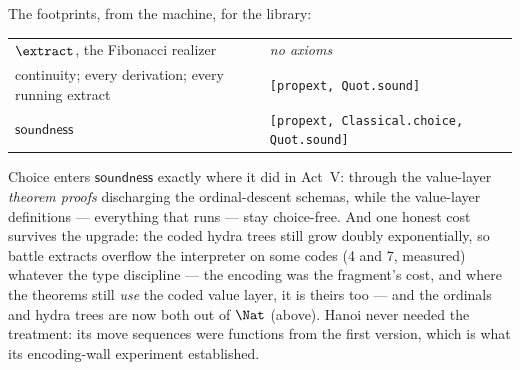 The footprints, from the machine, for the \haomega{} library:
\begin{center}\small
\begin{tabular}{ll}
\toprule
$\extract$, the Fibonacci realizer & \emph{no axioms}\\
continuity; every derivation; every running extract & \texttt{[propext, Quot.sound]}\\
$\mathsf{soundness}$ & \texttt{[propext, Classical.choice, Quot.sound]}\\
\bottomrule
\end{tabular}
\end{center}
Choice enters $\mathsf{soundness}$ exactly where it did in Act~V: through
the value-layer \emph{theorem proofs} discharging the ordinal-descent
schemas, while the value-layer definitions --- everything that runs ---
stay choice-free. And one honest cost survives the upgrade: the coded
hydra trees still grow doubly exponentially, so battle extracts overflow
the interpreter on some codes (4 and 7, measured) whatever the type
discipline --- the encoding was the fragment's cost, and where the
\haomega{} theorems still \emph{use} the coded value layer, it is theirs
too --- and the ordinals and hydra trees are now both out of $\Nat$ (above).
Hanoi never needed the treatment: its move sequences were functions from the
first version, which is what its encoding-wall experiment established.
